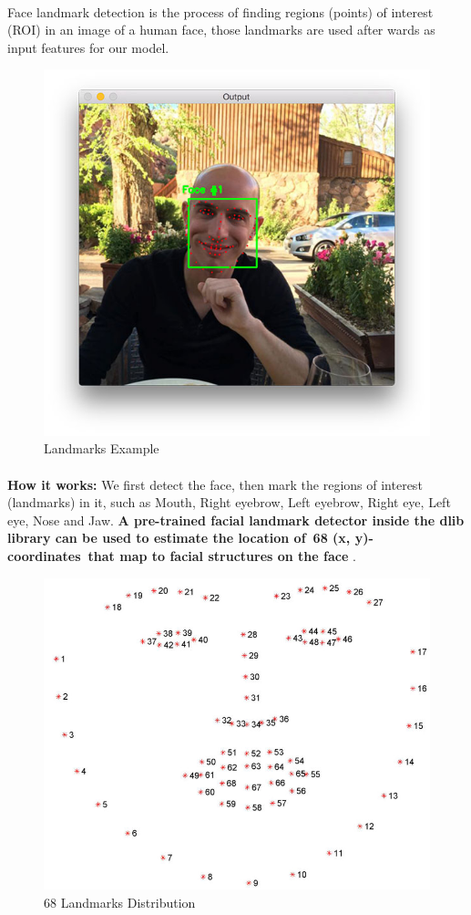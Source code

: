 \paragraph{}
Face landmark detection is the process of finding regions (points) of interest (ROI) in an image of a human face, those landmarks are used after wards as input features for our model.
\begin{figure}[H]
	\centering
	\includegraphics[width=.5\linewidth]{images/lm1.jpg}
	\caption{Landmarks Example}
\end{figure}
\paragraph{}
\textbf{How it works:}\newline
We first detect the face, then mark the regions of interest (landmarks) in it, such as Mouth, Right eyebrow, Left eyebrow, Right eye, Left eye, Nose and Jaw.\newline
\textbf{A pre-trained facial landmark detector inside the dlib library can be used to estimate the location of 68 (x, y)-coordinates that map to facial structures on the face} .

\begin{figure}[H]
	\centering
	\includegraphics[width=.5\linewidth]{images/lm2.jpg}
	\caption{68 Landmarks Distribution}
\end{figure}


